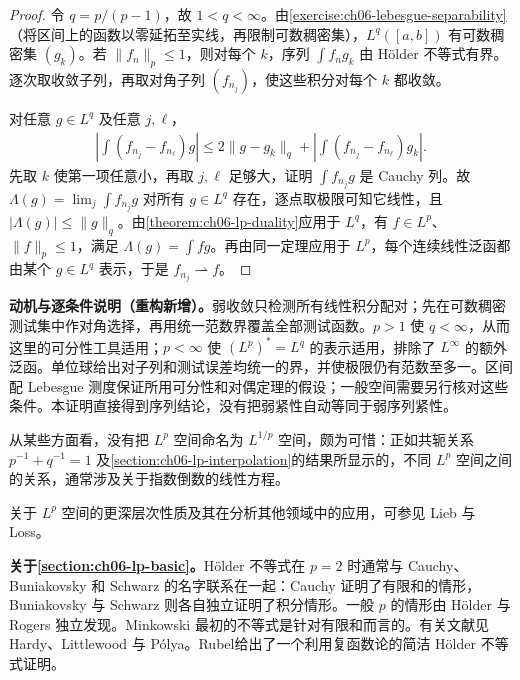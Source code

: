 \documentclass[../../main.tex]{subfiles}
\begin{document}
\begin{proof}
令 $q=p/(p-1)$，故 $1<q<\infty$。由\cref{exercise:ch06-lebesgue-separability}（将区间上的函数以零延拓至实线，再限制可数稠密集），$L^q([a,b])$ 有可数稠密集 $(g_k)$。若 $\|f_n\|_p\leqslant1$，则对每个 $k$，序列 $\int f_ng_k$ 由 Hölder 不等式有界。逐次取收敛子列，再取对角子列 $(f_{n_j})$，使这些积分对每个 $k$ 都收敛。

对任意 $g\in L^q$ 及任意 $j,\ell$，
\begin{align*}
\left|\int(f_{n_j}-f_{n_\ell})g\right|
\leqslant2\|g-g_k\|_q+
\left|\int(f_{n_j}-f_{n_\ell})g_k\right|.
\end{align*}
先取 $k$ 使第一项任意小，再取 $j,\ell$ 足够大，证明 $\int f_{n_j}g$ 是 Cauchy 列。故 $\Lambda(g)=\lim_j\int f_{n_j}g$ 对所有 $g\in L^q$ 存在，逐点取极限可知它线性，且 $|\Lambda(g)|\leqslant\|g\|_q$。由\cref{theorem:ch06-lp-duality}应用于 $L^q$，有 $f\in L^p$、$\|f\|_p\leqslant1$，满足 $\Lambda(g)=\int fg$。再由同一定理应用于 $L^p$，每个连续线性泛函都由某个 $g\in L^q$ 表示，于是 $f_{n_j}\rightharpoonup f$。
\end{proof}
\begin{remark}
\textbf{动机与逐条件说明（重构新增）。}弱收敛只检测所有线性积分配对；先在可数稠密测试集中作对角选择，再用统一范数界覆盖全部测试函数。$p>1$ 使 $q<\infty$，从而这里的可分性工具适用；$p<\infty$ 使 $(L^p)^*=L^q$ 的表示适用，排除了 $L^\infty$ 的额外泛函。单位球给出对子列和测试误差均统一的界，并使极限仍有范数至多一。区间配 Lebesgue 测度保证所用可分性和对偶定理的假设；一般空间需要另行核对这些条件。本证明直接得到序列结论，没有把弱紧性自动等同于弱序列紧性。
\end{remark}

从某些方面看，没有把 $L^p$ 空间命名为 $L^{1/p}$ 空间，颇为可惜：正如共轭关系 $p^{-1}+q^{-1}=1$ 及\cref{section:ch06-lp-interpolation}的结果所显示的，不同 $L^p$ 空间之间的关系，通常涉及关于指数倒数的线性方程。

关于 $L^p$ 空间的更深层次性质及其在分析其他领域中的应用，可参见 Lieb 与 Loss\cite{folland-bib-93}。

\textbf{关于\cref{section:ch06-lp-basic}。}Hölder 不等式在 $p=2$ 时通常与 Cauchy、Buniakovsky 和 Schwarz 的名字联系在一起：Cauchy 证明了有限和的情形，Buniakovsky 与 Schwarz 则各自独立证明了积分情形。一般 $p$ 的情形由 Hölder 与 Rogers 独立发现。Minkowski 最初的不等式是针对有限和而言的。有关文献见 Hardy、Littlewood 与 Pólya\cite{folland-bib-65}。Rubel\cite{folland-bib-122}给出了一个利用复函数论的简洁 Hölder 不等式证明。
\end{document}
